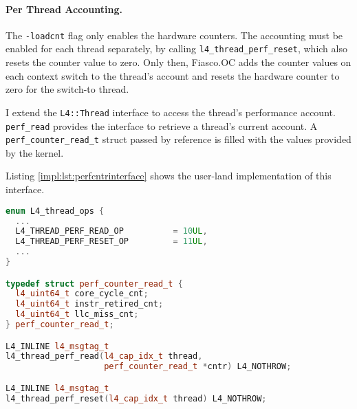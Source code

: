 \paragraph{Per Thread Accounting.}
The \texttt{-loadcnt} flag only enables the hardware counters.
The accounting must be enabled for each thread separately, by calling
\texttt{l4\_thread\_perf\_reset}, which also resets the counter value to zero.
Only then, Fiasco.OC adds the counter values on each context switch to the
thread's account and resets the hardware counter to zero for the switch-to thread.

I extend the \texttt{L4::Thread} interface to access the thread's performance
account.
\texttt{perf\_read} provides the interface to retrieve a thread's current
account.
A \texttt{perf\_counter\_read\_t} struct passed by reference is filled with the
values provided by the kernel.

Listing \ref{impl:lst:perfcntrinterface} shows the user-land implementation of
this interface.

\begin{lstlisting}[language=c++,
  caption={User land interface for retrieving and resetting a thread's
    performance counters; UTCB-pointer left out for brevity.},
  label={impl:lst:perfcntrinterface}]
enum L4_thread_ops {
  ...
  L4_THREAD_PERF_READ_OP	      = 10UL,
  L4_THREAD_PERF_RESET_OP	      =	11UL,
  ...
}

typedef struct perf_counter_read_t {
  l4_uint64_t core_cycle_cnt;
  l4_uint64_t instr_retired_cnt;
  l4_uint64_t llc_miss_cnt;
} perf_counter_read_t;

L4_INLINE l4_msgtag_t
l4_thread_perf_read(l4_cap_idx_t thread,
                    perf_counter_read_t *cntr) L4_NOTHROW;

L4_INLINE l4_msgtag_t
l4_thread_perf_reset(l4_cap_idx_t thread) L4_NOTHROW;
\end{lstlisting}
